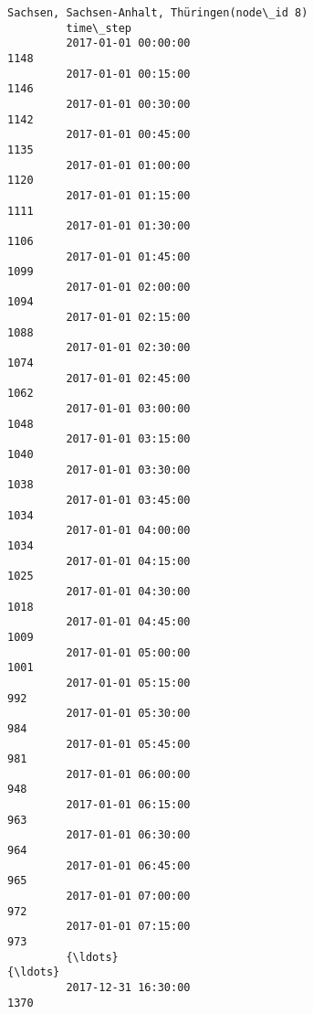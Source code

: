 \documentclass[11pt]{article}
\begin{document}
\begin{Verbatim}[commandchars=\\\{\}]
                              Sachsen, Sachsen-Anhalt, Thüringen(node\_id 8)  
         time\_step                                                           
         2017-01-01 00:00:00                                           1148  
         2017-01-01 00:15:00                                           1146  
         2017-01-01 00:30:00                                           1142  
         2017-01-01 00:45:00                                           1135  
         2017-01-01 01:00:00                                           1120  
         2017-01-01 01:15:00                                           1111  
         2017-01-01 01:30:00                                           1106  
         2017-01-01 01:45:00                                           1099  
         2017-01-01 02:00:00                                           1094  
         2017-01-01 02:15:00                                           1088  
         2017-01-01 02:30:00                                           1074  
         2017-01-01 02:45:00                                           1062  
         2017-01-01 03:00:00                                           1048  
         2017-01-01 03:15:00                                           1040  
         2017-01-01 03:30:00                                           1038  
         2017-01-01 03:45:00                                           1034  
         2017-01-01 04:00:00                                           1034  
         2017-01-01 04:15:00                                           1025  
         2017-01-01 04:30:00                                           1018  
         2017-01-01 04:45:00                                           1009  
         2017-01-01 05:00:00                                           1001  
         2017-01-01 05:15:00                                            992  
         2017-01-01 05:30:00                                            984  
         2017-01-01 05:45:00                                            981  
         2017-01-01 06:00:00                                            948  
         2017-01-01 06:15:00                                            963  
         2017-01-01 06:30:00                                            964  
         2017-01-01 06:45:00                                            965  
         2017-01-01 07:00:00                                            972  
         2017-01-01 07:15:00                                            973  
         {\ldots}                                                            {\ldots}  
         2017-12-31 16:30:00                                           1370  

\end{Verbatim}
\end{document}
